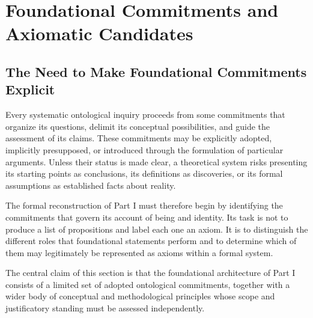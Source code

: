 %
%
%
%
%

\section{Foundational Commitments and Axiomatic Candidates}
\label{sec:ch07_s05}

\subsection{The Need to Make Foundational Commitments Explicit}

Every systematic ontological inquiry proceeds from some commitments
that organize its questions, delimit its conceptual possibilities,
and guide the assessment of its claims. These commitments may be
explicitly adopted, implicitly presupposed, or introduced through
the formulation of particular arguments. Unless their status is
made clear, a theoretical system risks presenting its starting
points as conclusions, its definitions as discoveries, or its
formal assumptions as established facts about reality.

The formal reconstruction of Part I must therefore begin by
identifying the commitments that govern its account of being and
identity. Its task is not to produce a list of propositions and
label each one an axiom. It is to distinguish the different roles
that foundational statements perform and to determine which of
them may legitimately be represented as axioms within a formal
system.

The central claim of this section is that the foundational
architecture of Part I consists of a limited set of adopted
ontological commitments, together with a wider body of conceptual
and methodological principles whose scope and justificatory
standing must be assessed independently.

